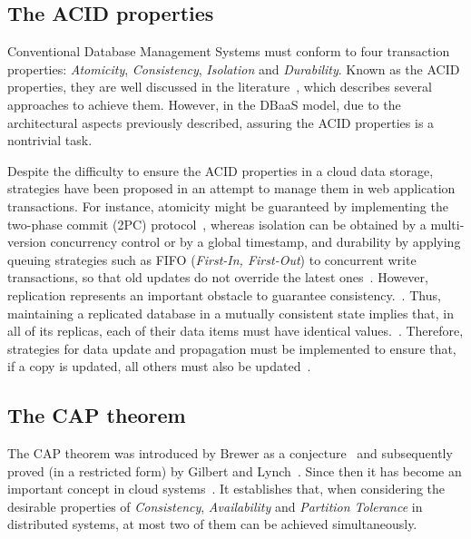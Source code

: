 \subsection{The ACID properties}

Conventional Database Management Systems must conform to four transaction properties: \textit{Atomicity}, \textit{Consistency}, \textit{Isolation} and \textit{Durability}. Known as the ACID properties, they are well discussed in the literature~\cite{acid1983}, which describes several approaches to achieve them. However, in the DBaaS model, due to the architectural aspects previously described, assuring the ACID {properties} is a nontrivial task. 

Despite the difficulty to ensure the ACID properties in a cloud data storage, strategies have been proposed in an attempt to manage them in web application transactions. For instance, atomicity might be guaranteed by implementing the two-phase commit (2PC) protocol~\cite{gray1978dbos}, whereas isolation can be obtained by a multi-version concurrency control %
or by a global timestamp, 
and durability %
by applying queuing strategies such as FIFO (\emph{First-In, First-Out}) to concurrent write transactions, so that old updates do not override the latest ones~\cite{Wei:2009}. 
However, replication represents an important obstacle to guarantee consistency.~\cite{Abadi09}. 
Thus, maintaining a replicated database in a mutually consistent state implies that, in all of its replicas, each of their data items must have identical values.~\cite{OzsuValduriez:2011}. 
Therefore, strategies for data update and propagation must be implemented to ensure that, if a copy is updated, all others must also be updated~\cite{tanenbaum:2007}.

\subsection{The CAP theorem}
\label{sec:2.3}
The CAP theorem was introduced by Brewer as a conjecture~\cite{Brewer2000} and subsequently proved (in  a restricted form) by Gilbert and  Lynch~\cite{Gilbert:2002}. 
Since then it has become an important concept in cloud systems~\cite{brewer2012}.
It establishes that, when considering the desirable properties of \textit{Consistency}, \textit{Availability} and %
{\al \textit{Partition  Tolerance}}
in distributed systems, at most two of them can be achieved simultaneously. 

